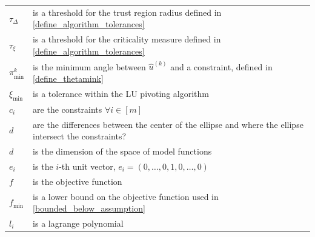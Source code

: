 \documentclass{article}
\theoremstyle{case}
\numberwithin{theorem}{subsection}
\newcommand{\fmin}{f_{\text{min}}}
\newcommand{\huk}{{{\hat u}^{(k)}}}
\newcommand{\thetamink}{{\pi^k_{\textrm{min}}}}
\newcommand{\tolcrit}{\tau_{\xi}}
\newcommand{\tolrad}{\tau_{\Delta}}
\begin{document}
\begin{longtable}{| p{} | p{} |}
$\tolrad$ & is a threshold for the trust region radius defined in \cref{define_algorithm_tolerances} \\ %
$\tolcrit$ & is a threshold for the criticality measure defined in \cref{define_algorithm_tolerances} \\ %
$\thetamink$ & is the minimum angle between $\huk$ and a constraint, defined in \cref{define_thetamink} \\ %
$\xi_{\text{min}}$ & is a tolerance within the LU pivoting algorithm \\ %
$c_i$ & are the constraints $\forall i \in [m]$ \\ %
$d$ & are the differences between the center of the ellipse and where the ellipse intersect the constraints? \\ %
$d$ & is the dimension of the space of model functions \\ %
$e_i$ & is the $i$-th unit vector, $e_i = (0, \ldots, 0, 1, 0, \ldots, 0)$ \\ %
$f$ & is the objective function \\ %
$\fmin$ & is a lower bound on the objective function used in \cref{bounded_below_assumption}\\ %
$l_i$ & is a lagrange polynomial \\ %

\end{longtable}
\end{document}
